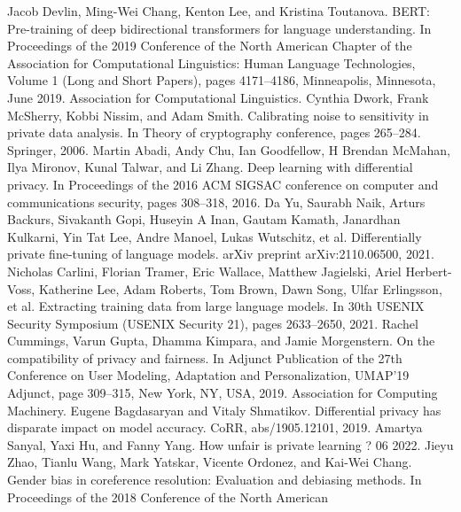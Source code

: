 \documentclass[11pt]{article} %
\begin{document}

% 
\begin{thebibliography}{10}
\itemsep=1pt
\begin{small}

 Jacob Devlin, Ming-Wei Chang, Kenton Lee, and Kristina Toutanova. BERT: Pre-training of deep bidirectional transformers for language understanding. In Proceedings of the 2019 Conference of the North American Chapter of the Association for Computational Linguistics: Human Language Technologies, Volume 1 (Long and Short Papers), pages 4171–4186, Minneapolis, Minnesota, June 2019. Association for Computational Linguistics.
 Cynthia Dwork, Frank McSherry, Kobbi Nissim, and Adam Smith. Calibrating noise to sensitivity in private data analysis. In Theory of cryptography conference, pages 265–284. Springer, 2006.
 Martin Abadi, Andy Chu, Ian Goodfellow, H Brendan McMahan, Ilya Mironov, Kunal Talwar, and Li Zhang. Deep learning with differential privacy. In Proceedings of the 2016 ACM SIGSAC conference on computer and communications security, pages 308–318, 2016.
 Da Yu, Saurabh Naik, Arturs Backurs, Sivakanth Gopi, Huseyin A Inan, Gautam Kamath, Janardhan Kulkarni, Yin Tat Lee, Andre Manoel, Lukas Wutschitz, et al. Differentially private fine-tuning of language models. arXiv preprint arXiv:2110.06500, 2021.
 Nicholas Carlini, Florian Tramer, Eric Wallace, Matthew Jagielski, Ariel Herbert-Voss, Katherine Lee, Adam Roberts, Tom Brown, Dawn Song, Ulfar Erlingsson, et al. Extracting training data from large language models. In 30th USENIX Security Symposium (USENIX Security 21), pages 2633–2650,
2021.
 Rachel Cummings, Varun Gupta, Dhamma Kimpara, and Jamie Morgenstern. On the compatibility of privacy and fairness. In Adjunct Publication of the 27th Conference on User Modeling, Adaptation and Personalization, UMAP’19 Adjunct, page 309–315, New York, NY, USA, 2019. Association for Computing Machinery.
 Eugene Bagdasaryan and Vitaly Shmatikov. Differential privacy has disparate impact on model accuracy. CoRR, abs/1905.12101, 2019.
 Amartya Sanyal, Yaxi Hu, and Fanny Yang. How unfair is private learning ? 06 2022.
 Jieyu Zhao, Tianlu Wang, Mark Yatskar, Vicente Ordonez, and Kai-Wei Chang. Gender bias in coreference resolution: Evaluation and debiasing
methods. In Proceedings of the 2018 Conference of the North American

\end{small}
\end{thebibliography}
\end{document}
